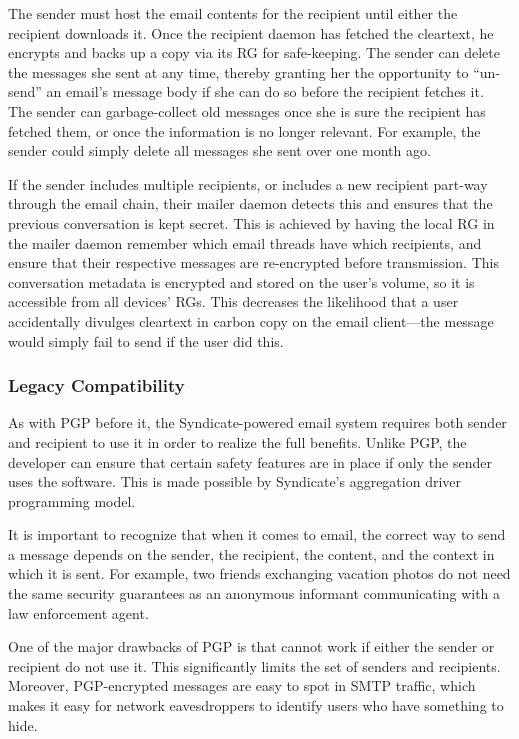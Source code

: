 The sender must host the email contents for the recipient until either the
recipient downloads it.  Once the recipient daemon has fetched the cleartext, he
encrypts and backs up a copy via its RG for safe-keeping.
The sender can delete the messages she sent at any time, thereby granting her
the opportunity to ``un-send'' an email's message body if she can do so before
the recipient fetches it.  The sender can garbage-collect old messages once
she is sure the recipient has fetched them, or once the information is no longer
relevant.  For example, the sender could simply delete all messages she
sent over one month ago.

If the sender includes multiple recipients, or includes a new recipient part-way
through the email chain, their mailer daemon detects this and ensures
that the previous conversation is kept secret.  This is achieved by having the
local RG in the mailer daemon remember which email threads have which
recipients, and ensure that their respective messages are re-encrypted before transmission.
This conversation metadata is encrypted and stored on the user's volume, so it
is accessible from all devices' RGs.  This decreases the likelihood that a user
accidentally divulges cleartext in carbon copy on the email client---the message
would simply fail to send if the user did this.

\subsubsection{Legacy Compatibility}

As with PGP before it, the Syndicate-powered email system requires both sender
and recipient to use it in order to realize the full benefits.  Unlike PGP, the
developer can ensure that certain safety features are in place if only the
sender uses the software.  This is made possible by Syndicate's
aggregation driver programming model.

It is important to recognize that when it comes to email, the correct way to
send a message depends on the sender, the recipient, the content, and the context in which
it is sent.  For example, two friends exchanging vacation photos do not need the same
security guarantees as an anonymous informant communicating with a law
enforcement agent.

One of the major drawbacks of PGP is that cannot work if either the
sender or recipient do not use it.  This significantly limits the set of senders
and recipients.  Moreover, PGP-encrypted messages are easy to spot in SMTP
traffic, which makes it easy for network eavesdroppers to identify users who
have something to hide.

